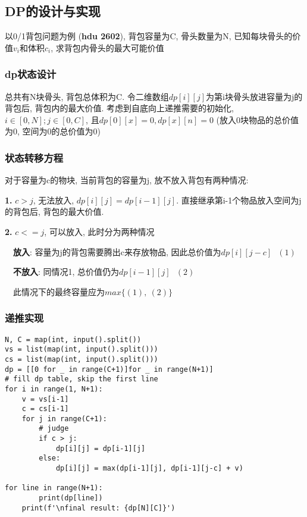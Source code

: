 \documentclass[../main]{subfiles}
\begin{document}
\begin{sloppy}
\newpage
\subsection{DP的设计与实现}

以0/1背包问题为例 (\textbf{hdu 2602}), 背包容量为C, 骨头数量为N, 已知每块骨头的价值$v_i$和体积$c_i$, 求背包内骨头的最大可能价值

\subsubsection{dp状态设计}

总共有N块骨头, 背包总体积为C. 令二维数组$dp[i][j]$为第i块骨头放进容量为j的背包后, 背包内的最大价值. 考虑到自底向上递推需要的初始化, $i \in [0, N]; j \in [0, C]$, 且$dp[0][x] = 0, dp[x][n] = 0$ (放入0块物品的总价值为0, 空间为0的总价值为0)

\subsubsection{状态转移方程}

对于容量为c的物块, 当前背包的容量为j, 放不放入背包有两种情况:

\textbf{1.} $c > j$, 无法放入, $dp[i][j] = dp[i-1][j]$. 直接继承第i-1个物品放入空间为j的背包后, 背包的最大价值.

\textbf{2.} $c <= j$, 可以放入, 此时分为两种情况

\ \ \textbf{放入}: 容量为j的背包需要腾出c来存放物品, 因此总价值为$dp[i][j-c]\ \ \ (1)$

\ \ \textbf{不放入}: 同情况1, 总价值仍为$dp[i-1][j]\ \ \ (2)$

\ \ 此情况下的最终容量应为$max\{(1),\ (2)\}$

\subsubsection{递推实现}

\begin{lstlisting}[style = Python]
N, C = map(int, input().split())
vs = list(map(int, input().split()))
cs = list(map(int, input().split())) 
dp = [[0 for _ in range(C+1)]for _ in range(N+1)]
# fill dp table, skip the first line
for i in range(1, N+1):
    v = vs[i-1]
    c = cs[i-1]
    for j in range(C+1):
        # judge 
        if c > j:
            dp[i][j] = dp[i-1][j]
        else:
            dp[i][j] = max(dp[i-1][j], dp[i-1][j-c] + v)

for line in range(N+1):
        print(dp[line])
    print(f'\nfinal result: {dp[N][C]}')
\end{lstlisting}


\end{sloppy}
\end{document}
